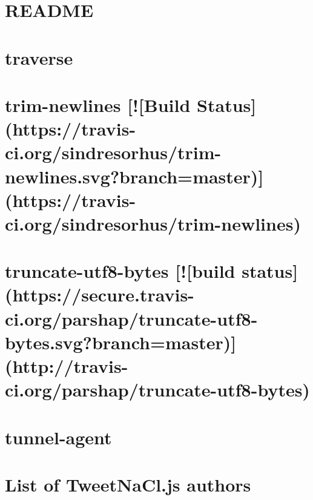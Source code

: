 \documentclass[twoside]{book}
\newcommand{\+}{\discretionary{\mbox{\scriptsize$\hookleftarrow$}}{}{}}
\begin{document}
\chapter{R\+E\+A\+D\+ME}
\label{md_dsmacc_vis_degree_node_modules_tough-cookie_README}

\chapter{traverse}
\label{md_dsmacc_vis_degree_node_modules_traverse_README}

\chapter{trim-\/newlines \mbox{[}!\mbox{[}Build Status\mbox{]}(https\+://travis-\/ci.org/sindresorhus/trim-\/newlines.svg?branch=master)\mbox{]}(https\+://travis-\/ci.org/sindresorhus/trim-\/newlines)}
\label{md_dsmacc_vis_degree_node_modules_trim-newlines_readme}

\chapter{truncate-\/utf8-\/bytes \mbox{[}!\mbox{[}build status\mbox{]}(https\+://secure.travis-\/ci.org/parshap/truncate-\/utf8-\/bytes.svg?branch=master)\mbox{]}(http\+://travis-\/ci.org/parshap/truncate-\/utf8-\/bytes)}
\label{md_dsmacc_vis_degree_node_modules_truncate-utf8-bytes_README}

\chapter{tunnel-\/agent}
\label{md_dsmacc_vis_degree_node_modules_tunnel-agent_README}

\chapter{List of Tweet\+Na\+Cl.\+js authors}
\label{md_dsmacc_vis_degree_node_modules_tweetnacl_AUTHORS}

\end{document}
